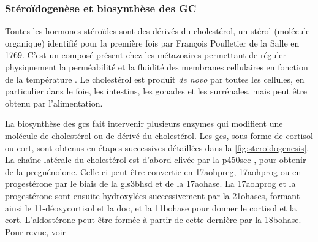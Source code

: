 \documentclass[../main.tex]{subfiles}
\begin{document}
		\subsubsection{Stéroïdogenèse et biosynthèse des GC}
			Toutes les hormones stéroïdes sont des dérivés du cholestérol, un stérol (molécule organique) identifié pour la première fois par François Poulletier de la Salle en 1769.
			C'est un composé présent chez les métazoaires permettant de réguler physiquement la perméabilité et la fluidité des membranes cellulaires en fonction de la température \citep{Cooper1978}.
			Le cholestérol est produit \textit{de novo} par toutes les cellules, en particulier dans le foie, les intestins, les gonades et les surrénales, mais peut être obtenu par l'alimentation.
			\par

			La biosynthèse des \glspl{gc} fait intervenir plusieurs enzymes qui modifient une molécule de cholestérol ou de dérivé du cholestérol.
			Les \glspl{gc}, sous forme de cortisol ou \gls{cort}, sont obtenus en étapes successives détaillées dans la \autoref{fig:steroidogenesis}.
			La chaîne latérale du cholestérol est d'abord clivée par la \gls{p450scc} \citep{Chung1986}, pour obtenir de la pregnénolone.
			Celle-ci peut être convertie en \gls{17aohpreg}, \gls{17aohprog} ou en progestérone par le biais de la gls{3bhsd} et de la \gls{17aohase}.
			La \gls{17aohprog} et la progestérone sont ensuite hydroxylées successivement par la \glspl{21ohase}, formant ainsi le 11-déoxycortisol et la \gls{doc}, et la \gls{11bohase} pour donner le cortisol et la \gls{cort}.
			L'aldostérone peut être formée à partir de cette dernière par la \gls{18bohase}.
			Pour revue, voir \citep{Ghayee2007}
\end{document}
